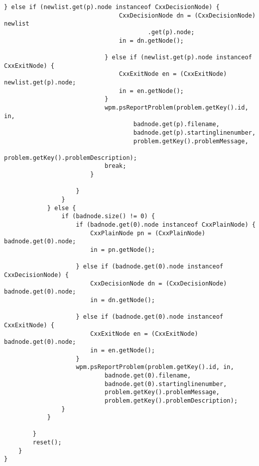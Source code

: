 \begin{lstlisting}[caption={Localizer},label={lst:Localizer}]
							} else if (newlist.get(p).node instanceof CxxDecisionNode) {
								CxxDecisionNode dn = (CxxDecisionNode) newlist
										.get(p).node;
								in = dn.getNode();

							} else if (newlist.get(p).node instanceof CxxExitNode) {
								CxxExitNode en = (CxxExitNode) newlist.get(p).node;
								in = en.getNode();
							}
							wpm.psReportProblem(problem.getKey().id, in,
									badnode.get(p).filename,
									badnode.get(p).startinglinenumber,
									problem.getKey().problemMessage,
									problem.getKey().problemDescription);
							break;
						}

					}
				}
			} else {
				if (badnode.size() != 0) {
					if (badnode.get(0).node instanceof CxxPlainNode) {
						CxxPlainNode pn = (CxxPlainNode) badnode.get(0).node;
						in = pn.getNode();

					} else if (badnode.get(0).node instanceof CxxDecisionNode) {
						CxxDecisionNode dn = (CxxDecisionNode) badnode.get(0).node;
						in = dn.getNode();

					} else if (badnode.get(0).node instanceof CxxExitNode) {
						CxxExitNode en = (CxxExitNode) badnode.get(0).node;
						in = en.getNode();
					}
					wpm.psReportProblem(problem.getKey().id, in,
							badnode.get(0).filename,
							badnode.get(0).startinglinenumber,
							problem.getKey().problemMessage,
							problem.getKey().problemDescription);
				}
			}

		}
		reset();
	}
}


\end{lstlisting}

